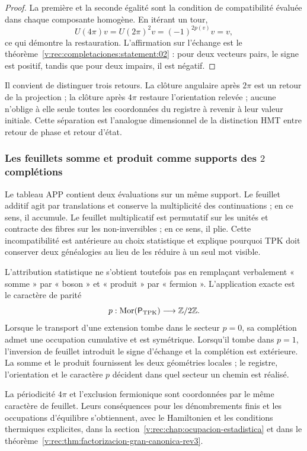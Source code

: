\begin{proof}
La première et la seconde égalité sont la condition de compatibilité évaluée
dans chaque composante homogène. En itérant un tour,
\[
 U(4\pi)v=U(2\pi)^2v=(-1)^{2p(v)}v=v,
\]
ce qui démontre la restauration. L’affirmation sur l’échange est le
théorème~\ref{v:rec:completaciones:statement:02} : pour deux vecteurs
pairs, le signe est positif, tandis que pour deux impairs, il est négatif.
\end{proof}

Il convient de distinguer trois retours. La clôture angulaire après \(2\pi\) est un
retour de la projection ; la clôture après \(4\pi\) restaure l’orientation
relevée ; aucune n’oblige à elle seule toutes les coordonnées du registre à
revenir à leur valeur initiale. Cette séparation est l’analogue dimensionnel de la
distinction HMT entre retour de phase et retour d’état.

\subsubsection{Les feuillets somme et produit comme supports des \(2\) complétions}
\label{v:rec:completaciones:section:06}

Le tableau APP contient deux évaluations sur un même support. Le feuillet
additif agit par translations et conserve la multiplicité des
continuations ; en ce sens, il accumule. Le feuillet multiplicatif est
permutatif sur les unités et contracte des fibres sur les non-inversibles ; en
ce sens, il plie. Cette incompatibilité est antérieure au choix
statistique et explique pourquoi TPK doit conserver deux généalogies au lieu de
les réduire à un seul mot visible.

L’attribution statistique ne s’obtient toutefois pas en remplaçant
verbalement « somme » par « boson » et « produit » par « fermion ». L’application exacte est
le caractère de parité
\[
 p:\operatorname{Mor}(\mathsf P_{\rm TPK})\longrightarrow\mathbb Z/2\mathbb Z.
\]
Lorsque le transport d’une extension tombe dans le secteur \(p=0\), sa
complétion admet une occupation cumulative et est symétrique. Lorsqu’il tombe dans
\(p=1\), l’inversion de feuillet introduit le signe d’échange et la
complétion est extérieure. La somme et le produit fournissent les deux
géométries locales ; le registre, l’orientation et le caractère \(p\) décident dans
quel secteur un chemin est réalisé.

La périodicité \(4\pi\) et l’exclusion fermionique sont coordonnées par
le même caractère de feuillet. Leurs conséquences pour les dénombrements finis et
les occupations d’équilibre s’obtiennent, avec le Hamiltonien et les
conditions thermiques explicites, dans la
section~\ref{v:rec:chap:ocupacion-estadistica} et dans le
théorème~\ref{v:rec:thm:factorizacion-gran-canonica-rev3}.


